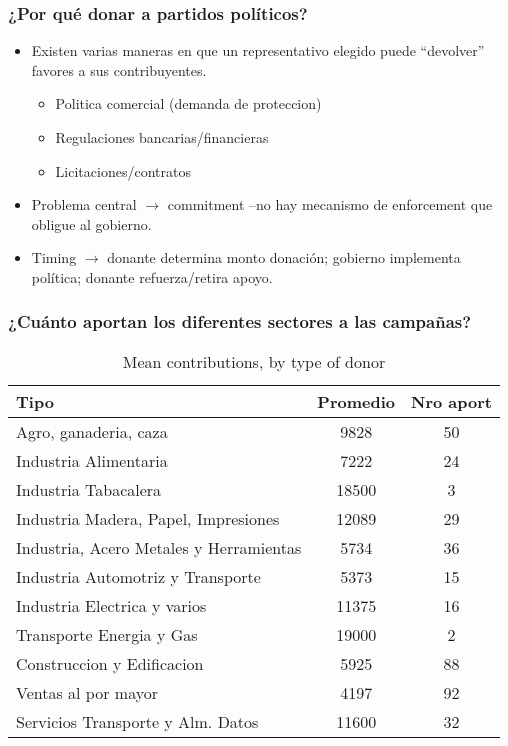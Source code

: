 \documentclass[handout,final,xcolor=dvipsnames]{beamer}
\begin{document}
\begin{frame}\frametitle{¿Por qué donar a partidos políticos?}
\begin{itemize}\itemsep 15pt
\item Existen varias maneras en que un representativo elegido puede
  ``devolver'' favores a sus contribuyentes.
\begin{itemize}
\item Politica comercial (demanda de proteccion)
\item Regulaciones bancarias/financieras
\item Licitaciones/contratos
\end{itemize}
\item Problema central $\longrightarrow$ commitment --no hay mecanismo
  de enforcement que obligue al gobierno.
\item Timing $\longrightarrow$ donante determina monto donación;
  gobierno implementa política; donante refuerza/retira apoyo.
\end{itemize}

\end{frame}


\begin{frame}\frametitle{¿Cuánto aportan los diferentes sectores a las
  campañas? }\vspace{-1cm}
  \begin{table}[htbp]
    \centering
 \caption{Mean contributions, by type of donor}
    \label{tab:1}
    \begin{tabular}[htbp]{|l|c|c|} \hline
      Tipo & Promedio & Nro aport\\ \hline \hline
Agro, ganaderia, caza & 9828 &  50      \\ \hline
Industria Alimentaria & 7222 & 24 \\ \hline
Industria Tabacalera & 18500 & 3 \\ \hline
Industria Madera, Papel, Impresiones & 12089 & 29 \\ \hline
Industria, Acero Metales y Herramientas & 5734 & 36 \\ \hline
Industria Automotriz y Transporte & 5373 & 15 \\ \hline
Industria Electrica y varios & 11375 & 16 \\ \hline
Transporte Energia y Gas & 19000 & 2 \\ \hline
Construccion y Edificacion & 5925 & 88 \\ \hline
Ventas al por mayor & 4197 & 92 \\ \hline
Servicios Transporte y Alm. Datos & 11600 & 32 \\ \hline \hline
    \end{tabular}
  \end{table}
\end{frame}
\end{document}
